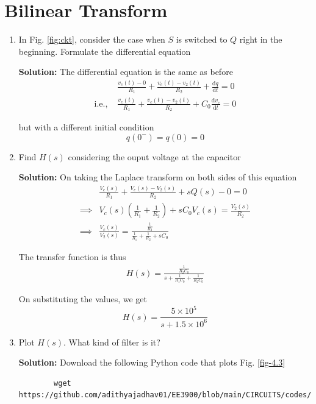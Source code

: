 \documentclass[journal,12pt,twocolumn]{IEEEtran}
\newcommand{\solution}{\noindent \textbf{Solution: }}
\providecommand{\brak}[1]{\ensuremath{\left(#1\right)}}
\providecommand{\der}[1]{\mathrm{d} #1}
\numberwithin{equation}{section}
\numberwithin{figure}{section}
\renewcommand\thesection{\arabic{section}}
\begin{document}
	\section{Bilinear Transform}
	\begin{enumerate}[label=\thesection.\arabic*.,ref=\thesection.\theenumi]
	\item In Fig. \ref{fig:ckt}, consider the case when $S$ is switched to $Q$ right in the beginning. Formulate the differential equation
	
	\solution The differential equation is the same as before 
	\begin{align}
		&\frac{v_c(t) - 0}{R_1} + \frac{v_c(t) - v_2(t)}{R_2} + \frac{\der{q}}{\der{t}} = 0 \\
		\text{i.e., } &\frac{v_c(t)}{R_1} + \frac{v_c(t) - v_2(t)}{R_2} + C_0\frac{\der{v_c}}{\der{t}} = 0
	\end{align}
	
	but with a different initial condition
	\begin{equation}
		q(0^-) = q(0) = 0
	\end{equation}
	
	\item Find $H(s)$ considering the ouput voltage at the capacitor
	
	\solution On taking the Laplace transform on both sides of this equation
	\begin{align}
		&\frac{V_c(s)}{R_1} + \frac{V_c(s) - V_2(s)}{R_2} + sQ(s) - 0 = 0 \\
		\implies &V_c(s) \brak{\frac{1}{R_1} + \frac{1}{R_2}} + sC_0V_c(s) = \frac{V_2(s)}{R_2} \\
		\implies &\frac{V_c(s)}{V_2(s)} = \frac{\frac{1}{R_2}}{\frac{1}{R_1} + \frac{1}{R_2} + sC_0}
	\end{align}
	
	The transfer function is thus
	\begin{align}
		H(s) = \frac{\frac{1}{R_2C_0}}{s + \frac{1}{R_1C_0} + \frac{1}{R_2C_0}}
	\end{align}
	
	On substituting the values, we get
	\begin{equation}
		H(s) = \frac{5 \times 10^5}{s + 1.5 \times 10^6}
	\end{equation}
	
	\item Plot $H(s)$.  What kind of filter is it?
	
	\solution Download the following Python code that plots Fig. \ref{fig-4.3}
	\begin{lstlisting}
		wget https://github.com/adithyajadhav01/EE3900/blob/main/CIRCUITS/codes/4.3.py
	\end{lstlisting}
	

\end{enumerate}
\end{document}
